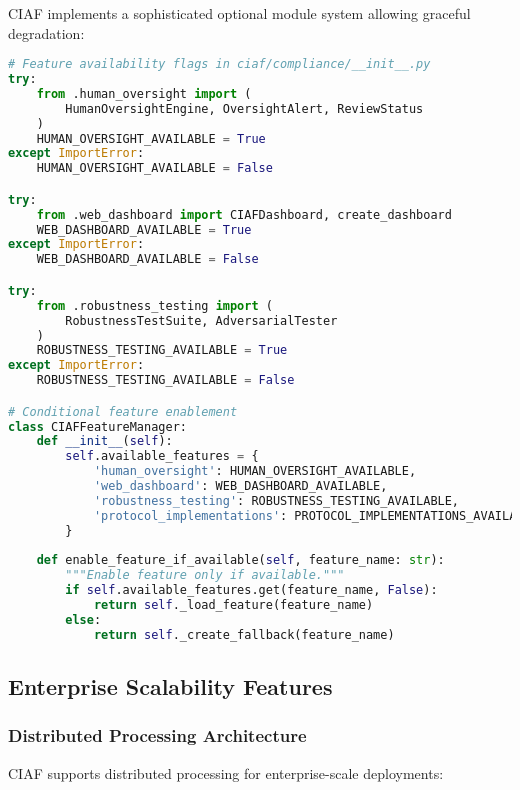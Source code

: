 \documentclass[12pt,a4paper]{article}
\begin{document}
CIAF implements a sophisticated optional module system allowing graceful degradation:

\begin{lstlisting}[language=Python, caption=Optional Module System]
# Feature availability flags in ciaf/compliance/__init__.py
try:
    from .human_oversight import (
        HumanOversightEngine, OversightAlert, ReviewStatus
    )
    HUMAN_OVERSIGHT_AVAILABLE = True
except ImportError:
    HUMAN_OVERSIGHT_AVAILABLE = False

try:
    from .web_dashboard import CIAFDashboard, create_dashboard
    WEB_DASHBOARD_AVAILABLE = True
except ImportError:
    WEB_DASHBOARD_AVAILABLE = False

try:
    from .robustness_testing import (
        RobustnessTestSuite, AdversarialTester
    )
    ROBUSTNESS_TESTING_AVAILABLE = True
except ImportError:
    ROBUSTNESS_TESTING_AVAILABLE = False

# Conditional feature enablement
class CIAFFeatureManager:
    def __init__(self):
        self.available_features = {
            'human_oversight': HUMAN_OVERSIGHT_AVAILABLE,
            'web_dashboard': WEB_DASHBOARD_AVAILABLE,
            'robustness_testing': ROBUSTNESS_TESTING_AVAILABLE,
            'protocol_implementations': PROTOCOL_IMPLEMENTATIONS_AVAILABLE
        }
    
    def enable_feature_if_available(self, feature_name: str):
        """Enable feature only if available."""
        if self.available_features.get(feature_name, False):
            return self._load_feature(feature_name)
        else:
            return self._create_fallback(feature_name)
\end{lstlisting}

\subsection{Enterprise Scalability Features}

\subsubsection{Distributed Processing Architecture}

CIAF supports distributed processing for enterprise-scale deployments:
\end{document}
